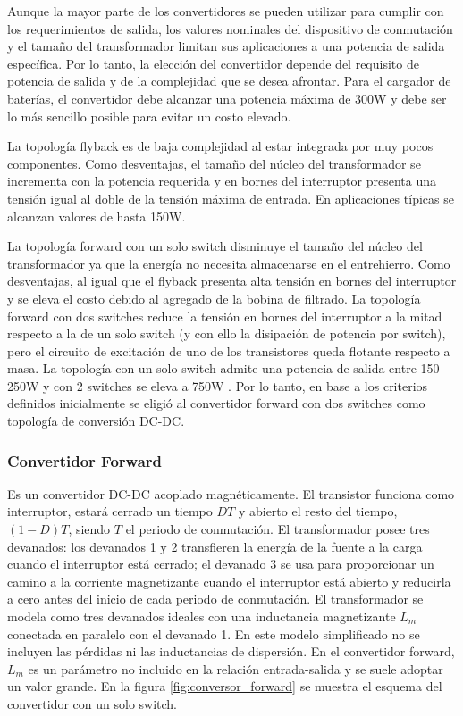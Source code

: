 Aunque la mayor parte de los convertidores se pueden utilizar para cumplir con los requerimientos de salida, 
los valores nominales del dispositivo de conmutación y el tamaño del transformador limitan sus aplicaciones a una potencia de salida específica. 
Por lo tanto, la elección del convertidor depende del requisito de potencia de salida y de la complejidad que se desea afrontar.
Para el cargador de baterías, el convertidor debe alcanzar una potencia máxima de 300W y debe ser lo más sencillo posible para evitar un costo elevado. 

La topología flyback es de baja complejidad al estar integrada por muy pocos componentes. 
Como desventajas, el tamaño del núcleo del transformador se incrementa con la potencia requerida y en bornes del
interruptor presenta una tensión igual al doble de la tensión máxima de entrada.
En aplicaciones típicas se alcanzan valores de hasta 150W.

La topología forward con un solo switch disminuye el tamaño del núcleo del transformador ya que la energía no necesita almacenarse en el entrehierro.
Como desventajas, al igual que el flyback presenta alta tensión en bornes del interruptor y se eleva el costo debido al agregado de la bobina de filtrado.
La topología forward con dos switches reduce la tensión en bornes del interruptor a la mitad respecto a la de un solo switch (y con ello la disipación de potencia por switch), 
pero el circuito de excitación de uno de los transistores queda flotante respecto a masa. 
La topología con un solo switch admite una potencia de salida entre 150-250W y con 2 switches se eleva a 750W \cite{mohan}\cite{hart}. 
Por lo tanto, en base a los criterios definidos inicialmente se eligió al convertidor forward con dos switches como topología de conversión DC-DC. 

\subsubsection{Convertidor Forward}

Es un convertidor DC-DC acoplado magnéticamente. El transistor funciona como interruptor, estará cerrado un tiempo $DT$ y abierto el resto del tiempo,
$(1 - D)T$, siendo $T$ el periodo de conmutación. 
El transformador posee tres devanados: los devanados 1 y 2 transfieren la energía de la
fuente a la carga cuando el interruptor está cerrado; el devanado 3 se usa para proporcionar un
camino a la corriente magnetizante cuando el interruptor está abierto y reducirla a cero antes del
inicio de cada periodo de conmutación. El transformador se modela como tres devanados ideales
con una inductancia magnetizante $L_m$ conectada en paralelo con el devanado 1. En este modelo simplificado no se incluyen las pérdidas ni las inductancias de dispersión.
En el convertidor forward, $L_m$ es un parámetro no incluido en la relación entrada-salida y se suele adoptar un valor grande.
En la figura \ref{fig:conversor_forward} se muestra el esquema del convertidor con un solo switch.

